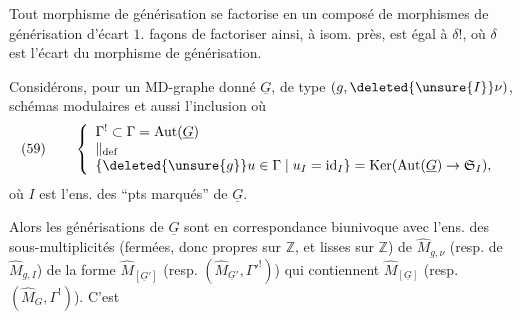 Tout morphisme de générisation se factorise en un composé de morphismes de générisation d'écart $1$.   façons de factoriser ainsi, à isom. près, est égal à $\delta!$, où $\delta$ est l'écart du morphisme de générisation.

Considérons, pour un MD-graphe donné $\underline{G}$, de type  $(g,\deleted{\unsure{I}}\nu)$,   schémas modulaires 
et aussi l'inclusion
où
\[
\text{(59)}\qquad
\left\{\begin{array}{l}
\Gamma^!\subset\Gamma=\operatorname{Aut}(\underline G)\\
\Vert_{\mathrm{def}}\\
\{\deleted{\unsure{g}}u\in\Gamma\mid u_I=\operatorname{id}_I\}=\operatorname{Ker}(\operatorname{Aut}(\underline G)\to\mathfrak S_I),
\end{array}\right.
\]
où $I$ est l'ens. des ``pts marqués'' de $\underline G$.

Alors les  générisations de $\underline G$ sont en correspondance biunivoque avec l'ens. des sous-multiplicités (fermées,  donc propres sur $\mathbb Z$, et lisses sur $\mathbb Z$) de $\widehat M_{g,\nu}$ (resp. de $\widehat M_{g,I}$) de la forme $\widehat M_{[\underline G']}$ (resp. $(\widehat M_{\underline G'},\Gamma'^!)$) qui contiennent $\widehat M_{[\underline G]}$ (resp. $(\widehat M_G,\Gamma^!)$). C'est
